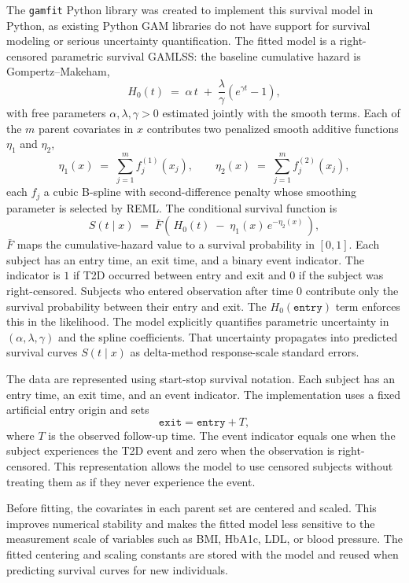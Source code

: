 \documentclass[11pt]{article}
\begin{document}
The \texttt{gamfit} Python library was created to implement this survival model in Python, as existing Python GAM libraries do not have support for survival modeling or serious uncertainty quantification. The fitted model is a right-censored parametric survival GAMLSS: the baseline cumulative hazard is Gompertz--Makeham,
\[
H_0(t) \;=\; \alpha\,t \;+\; \frac{\lambda}{\gamma}\!\left(e^{\gamma t}-1\right),
\]
with free parameters $\alpha,\lambda,\gamma > 0$ estimated jointly with the smooth terms. Each of the $m$ parent covariates in $x$ contributes two penalized smooth additive functions $\eta_1$ and $\eta_2$,
\[
\eta_1(x) \;=\; \sum_{j=1}^{m} f_{j}^{(1)}(x_j),
\qquad
\eta_2(x) \;=\; \sum_{j=1}^{m} f_{j}^{(2)}(x_j),
\]
each $f_j$ a cubic B-spline with second-difference penalty whose smoothing parameter is selected by REML. The conditional survival function is
\[
S(t \mid x) \;=\; \bar{F}\!\left(\,H_0(t) \;-\; \eta_1(x)\,e^{-\eta_2(x)}\,\right),
\]
$\bar{F}$ maps the cumulative-hazard value to a survival probability in $[0,1]$. Each subject has an entry time, an exit time, and a binary event indicator. The indicator is $1$ if T2D occurred between entry and exit and $0$ if the subject was right-censored. Subjects who entered observation after time $0$ contribute only the survival probability between their entry and exit. The $H_0(\texttt{entry})$ term enforces this in the likelihood. The model explicitly quantifies parametric uncertainty in $(\alpha,\lambda,\gamma)$ and the spline coefficients. That uncertainty propagates into predicted survival curves $S(t \mid x)$ as delta-method response-scale standard errors.

The data are represented using start-stop survival notation. Each subject has an entry time, an exit time, and an event indicator. The implementation uses a fixed artificial entry origin and sets
\[
\texttt{exit} = \texttt{entry} + T,
\]
where $T$ is the observed follow-up time. The event indicator equals one when the subject experiences the T2D event and zero when the observation is right-censored. This representation allows the model to use censored subjects without treating them as if they never experience the event.

Before fitting, the covariates in each parent set are centered and scaled. This improves numerical stability and makes the fitted model less sensitive to the measurement scale of variables such as BMI, HbA1c, LDL, or blood pressure. The fitted centering and scaling constants are stored with the model and reused when predicting survival curves for new individuals.
\end{document}
